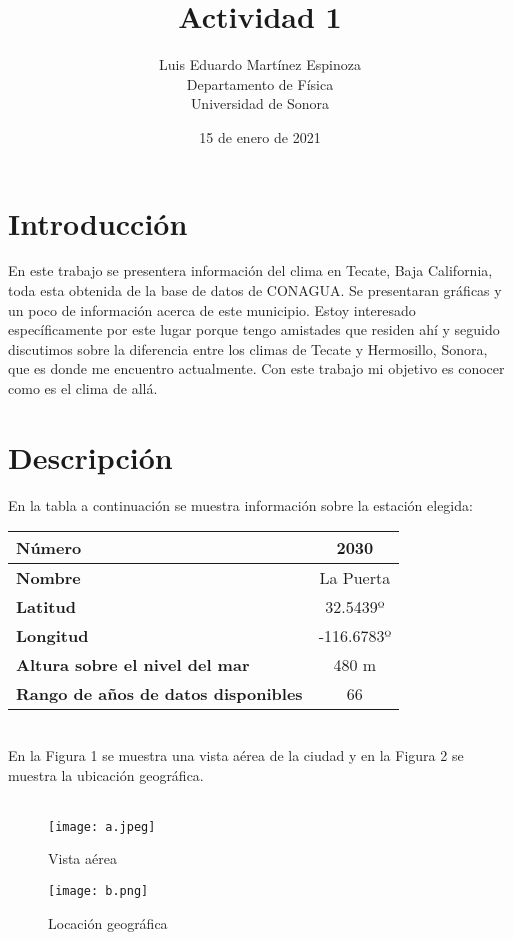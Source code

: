 \documentclass{article}
\title{Actividad 1}
\author{Luis Eduardo Martínez Espinoza \\
Departamento de Física \\
Universidad de Sonora}
\date{15 de enero de 2021}
\begin{document}
  
\maketitle 


\section{Introducción}
En este trabajo se presentera información del clima en Tecate, Baja California, toda esta obtenida de la base de datos de CONAGUA. Se presentaran gráficas y un poco de información acerca de este municipio. Estoy interesado específicamente por este lugar porque tengo amistades que residen ahí y seguido discutimos sobre la diferencia entre los climas de Tecate y Hermosillo, Sonora, que es donde me encuentro actualmente. Con este trabajo mi objetivo es conocer como es el clima de allá. 

\section{Descripción}
\noindent En la tabla a continuación se muestra información sobre la estación elegida: \\

\begin{center}
\begin{tabular}{ |p{3cm}|c|}
 \hline
 \textbf{Número}& 2030\\
  \hline
 \textbf{Nombre}& La Puerta\\
  \hline
 \textbf{Latitud}& 32.5439º\\
  \hline
 \textbf{Longitud}& -116.6783º\\
  \hline
 \textbf{Altura sobre el nivel del mar}& 480 m\\
  \hline
 \textbf{Rango de años de datos disponibles}& 66\\
 \hline
\end{tabular}
\end{center}

\\En la Figura 1 se muestra una vista aérea de la ciudad y en la Figura 2 se muestra la ubicación geográfica.\\ \\ 

\begin{figure}[H]
    \centering
    \texttt{[image: a.jpeg]}
    \caption{Vista aérea}
    \label{fig:my_label}
\end{figure}
\begin{figure}[H]
    \centering
    \texttt{[image: b.png]}
    \caption{Locación geográfica}
    \label{fig:my_label}
\end{figure}
\end{document}
